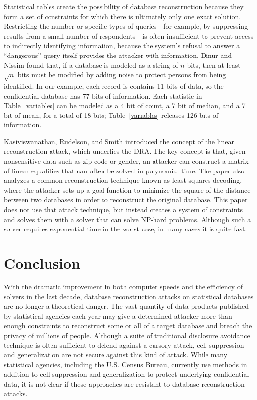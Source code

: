 \documentclass[runningheads]{llncs}
\begin{document}
Statistical tables create the possibility of database reconstruction
because they form a set of constraints for which there is ultimately
only one exact solution. Restricting the number or specific types of
queries---for example, by suppressing results from a small number of
respondents---is often insufficient to prevent access to indirectly
identifying information, because the system's refusal to answer a
``dangerous'' query itself provides the attacker with information.
Dinur and Nissim found that, if a database is modeled as a string of
$n$ bits, then at least $\sqrt{n}$ bits must be modified by adding
noise to protect persons from being identified. In our example, each
record is contains 11 bits of data, so the confidential database has
77 bits of information. Each statistic in Table~\ref{variables}
can be modeled as a 4 bit of count, a 7 bit of median, and a 7 bit of
mean, for a total of 18 bits; Table~\ref{variables} releases 126 bits
of information.

Kasiviswanathan, Rudelson, and Smith\cite{Kasiviswanathan:2013:PLR:2627817.2627919} introduced
the concept of the linear reconstruction attack, which underlies the  DRA. The key concept is that,
given nonsensitive data such as zip code or gender, an attacker
can construct a matrix of linear equalities that can often be solved
in polynomial time. The paper also analyzes a common reconstruction
technique known as least squares decoding, where the attacker sets up
a goal function to minimize the square of the distance between two
databases in order to reconstruct the original database. This paper
does not use that attack technique, but instead creates a system of
constraints and solves them with a solver that can solve NP-hard
problems. Although such a solver requires exponential time in the
worst case, in many cases it is quite fast.

\section{Conclusion}

With the dramatic improvement in both computer speeds and the
efficiency of solvers in the
last decade, database reconstruction attacks on statistical databases are no longer a 
theoretical danger. The vast quantity of data products published by
statistical agencies each year may give a determined attacker 
more than enough constraints to reconstruct some or all of a target database and
breach the privacy of millions of people. Although a suite of traditional
disclosure avoidance technique is often sufficient to defend against a
cursory attack, cell suppression and generalization are not secure
against this kind of 
attack. 
While many statistical agencies, including the U.S. Census Bureau, currently use methods in addition to cell suppression and generalization to protect underlying confidential data, it is not clear if these approaches are resistant to database reconstruction attacks.
\end{document}
